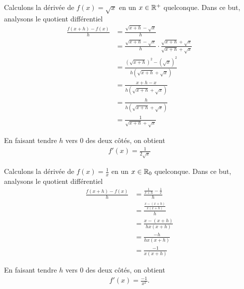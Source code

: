 \documentclass[main.tex]{subfiles}
\begin{document}
\begin{example}

    Calculons la dérivée de $f(x) = \sqrt x$ en un $x \in \mathbb{R}^+$ quelconque.
    Dans ce but,
    analysons le quotient différentiel
    \begin{align}
        \frac {f(x + h) - f(x)} h
        &= \frac {\sqrt {x + h} - \sqrt x} h\\
        &= \frac {\sqrt {x + h} - \sqrt x} h \cdot \frac{\sqrt{x + h} + \sqrt x}{\sqrt{x + h} + \sqrt x}\\
        &= \frac {(\sqrt {x + h})^2 - (\sqrt{x})^2}{h (\sqrt {x + h} + \sqrt {x})}\\
        &= \frac {x + h - x} {h (\sqrt {x + h} + \sqrt {x})}\\
        &= \frac {h} {h (\sqrt {x + h} + \sqrt {x})}\\
        &= \frac 1 {\sqrt {x + h} + \sqrt {x}}
    \end{align}

    En faisant tendre $h$ vers $0$ des deux côtés,
    on obtient
    \begin{align}
        f'(x) = \frac 1 {2 \sqrt x}
    \end{align}
\end{example}

\begin{example}

    Calculons la dérivée de $f(x) = \frac 1 x$ en un $x \in \mathbb{R}_0$ quelconque.
    Dans ce but,
    analysons le quotient différentiel
    \begin{align}
        \frac {f(x + h) - f(x)} h
        &= \frac {\frac 1 {x + h} - \frac 1 x} h\\
        &= \frac{\frac{x - (x + h)}{x (x + h)}}{h}\\
        &= \frac {x - (x + h)} {h x (x + h)}\\
        &= \frac{-h}{h x (x + h)}\\
        &= \frac {-1} {x (x + h)}
    \end{align}

    En faisant tendre $h$ vers $0$ des deux côtés,
    on obtient
    \begin{align}
        f'(x) = \frac {-1} {x^2}.
    \end{align}
\end{example}
\end{document}
